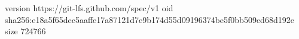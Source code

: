 version https://git-lfs.github.com/spec/v1
oid sha256:e18a5f65dec5aaffe17a87121d7e9b174d55d09196374be5f0bb509ed68d192e
size 724766
